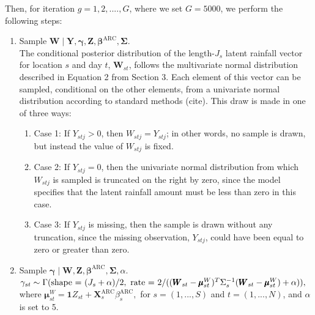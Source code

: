 \documentclass[11pt]{article}
\def\bbeta{\pmb{\beta}}
\def\bgamma{\pmb{\gamma}}
\def\bmu{\pmb{\mu}}
\def\bSigma{\pmb{\Sigma}}
\def\bX{\pmb{X}}
\def\bY{\pmb{Y}}
\def\bZ{\pmb{Z}}
\def\bW{\pmb{W}}
\begin{document}
Then, for iteration $g = 1, 2, ...., G$, where we set $G = 5000$, we perform the following steps:
\begin{enumerate}

\item Sample $\bW \mid \bY, \bgamma, \bZ, \bbeta^\text{ARC}, \bSigma$.\\
The conditional posterior distribution of the length-$J_s$ latent rainfall vector for location $s$ and day $t$, $\bW_{st}$, follows the multivariate normal distribution described in Equation 2 from Section 3. Each element of this vector can be sampled, conditional on the other elements, from a univariate normal distribution according to standard methods (cite). This draw is made in one of three ways:
\begin{enumerate}
\item Case 1: If $Y_{stj} > 0$, then $W_{stj} = Y_{stj}$; in other words, no sample is drawn, but instead the value of $W_{stj}$ is fixed.
\item Case 2: If $Y_{stj} = 0$, then the univariate normal distribution from which $W_{stj}$ is sampled  is truncated on the right by zero, since the model specifies that the latent rainfall amount must be less than zero in this case.
\item Case 3: If $Y_{stj}$ is missing, then the sample is drawn without any truncation, since the missing observation, $Y_{stj}$, could have been equal to zero or greater than zero.
\end{enumerate}

\item Sample $\bgamma \mid \bW, \bZ, \bbeta^\text{ARC}, \bSigma, \alpha$. \\
$
\gamma_{st} \sim \Gamma(\text{shape = }(J_s + \alpha)/2, \text{ rate = }2/((\bW_{st} - \bmu^W_{st})^T\Sigma_s^{-1}(\bW_{st} - \bmu^W_{st}) + \alpha)),\\
$ where
$
\bmu^W_{st} = \mathbf{1}Z_{st} + \bX_{s}^\text{ARC}\beta_s^\text{ARC},
$
for $s = (1, ..., S)$ and $t = (1, ..., N)$, and $\alpha$ is set to 5.


\end{enumerate}
\end{document}
